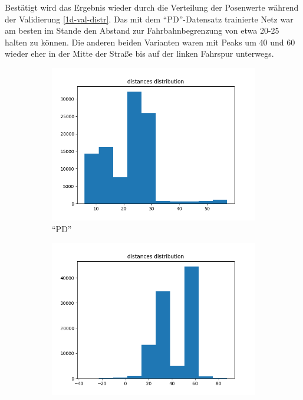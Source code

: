 Bestätigt wird das Ergebnis wieder durch die Verteilung der Posenwerte während der Validierung \ref{1d-val-distr}. Das mit dem ``PD''-Datensatz trainierte Netz war am besten im Stande den Abstand zur Fahrbahnbegrenzung von etwa 20-25 halten zu können. Die anderen beiden Varianten waren mit Peaks um 40 und 60 wieder eher in der Mitte der Straße bis auf der linken Fahrspur unterwegs.

\begin{figure}[H]
	\centering
	\begin{subfigure}[h]{0.3\textwidth}
		\centering
		\includegraphics[width=\linewidth]{kapitel5/images/eval/d-only/pd-distr.png}
		\caption{``PD''}
		\label{1d-pd-val-distr}
	\end{subfigure}%
	\begin{subfigure}[h]{0.3\textwidth}
		\centering
		\includegraphics[width=\linewidth]{kapitel5/images/eval/d-only/pd-rand-distr.png}

\end{subfigure}
\end{figure}
